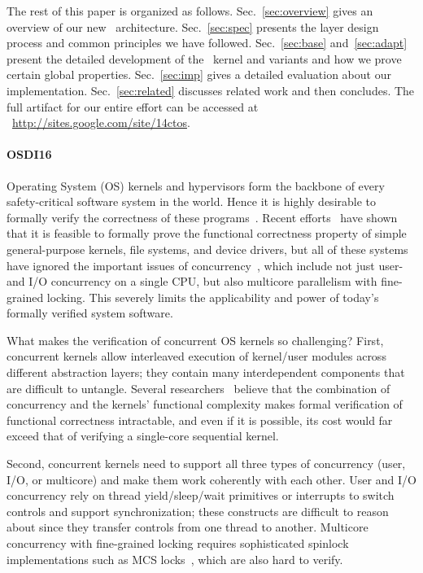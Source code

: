 The rest of this paper is organized as follows.
Sec.~\ref{sec:overview} gives an overview of our new
\CTOS\ architecture. Sec.~\ref{sec:spec} presents the layer design
process and common principles we have followed. Sec.~\ref{sec:base}
and~\ref{sec:adapt} present the detailed development of the
\mCTOS\ kernel and variants and how we prove certain global properties.
Sec.~\ref{sec:imp} gives a detailed evaluation about our
implementation. Sec.~\ref{sec:related} %
discusses
related work and then concludes.  The full artifact for our entire
effort can be accessed at
{~\small\url{http://sites.google.com/site/14ctos}}.


\paragraph{OSDI16}
Operating System (OS) kernels and hypervisors form the backbone of
every safety-critical software system in the world.  Hence it is
highly desirable to formally verify the correctness of these
programs~\cite{shao10}. 
Recent efforts~\cite{klein2009sel4,hawblitzel10,klein14,ironclad14,dscal15,fscq15,cogent16,chen16}
have shown that it is feasible to formally prove the functional
correctness property of simple general-purpose kernels, file systems,
and device drivers, but all of these systems have ignored the
important issues of concurrency~\cite{kaashoek15,ospp11}, which
include not just user- and I/O concurrency on a single CPU, but also
multicore parallelism with fine-grained locking. This severely limits
the applicability and power of today's formally verified system
software.

What makes the verification of concurrent OS kernels so challenging?
First, concurrent kernels allow interleaved execution of kernel/user
modules across different abstraction layers; they contain many
interdependent components that are difficult to untangle.  Several
researchers~\cite{vontessin13,peters15} believe that the combination
of concurrency and the kernels' functional complexity makes formal
verification of functional correctness intractable, and even if it is
possible, its cost would far exceed that of verifying a single-core
sequential kernel.

Second, concurrent kernels need to support all three types of
concurrency (user, I/O, or multicore) and make them work coherently
with each other. User and I/O concurrency rely on thread
yield/sleep/wait primitives or interrupts to switch controls and
support synchronization; these constructs are difficult to reason
about since they transfer controls from one thread to another.
Multicore concurrency with fine-grained locking requires sophisticated
spinlock implementations such as MCS locks~\cite{mcs91}, which are also
hard to verify.

